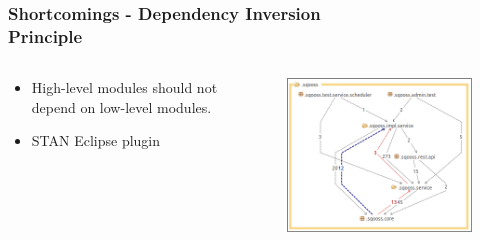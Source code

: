 \documentclass{beamer}
\begin{document}
\begin{frame}
    \frametitle{Shortcomings - Dependency Inversion \\ Principle}
	\begin{columns}
	
	\begin{column}{0.4\textwidth}    
    		\begin{itemize}
    		    \item High-level modules should not depend on low-level modules.
    		    \item STAN Eclipse plugin
    		\end{itemize}
    \end{column}
    
    \begin{column}{0.6\textwidth}
    		\begin{figure}
    		\centering
    		\includegraphics[width=\textwidth]{../img/impl-depedency.png}
    		\end{figure}
    \end{column}
    
    \end{columns}
\end{frame}
\end{document}
